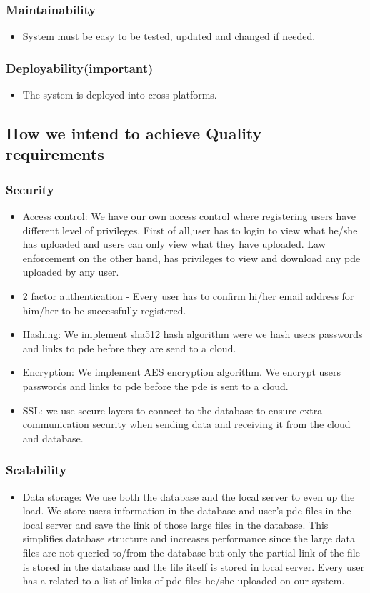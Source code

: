 \documentclass[a4paper,12pt]{article}
\begin{document}
	\subsubsection{Maintainability}
		\begin{itemize}
			\item System must be easy to be tested, updated and changed if needed.
		\end{itemize}
	\subsubsection{Deployability(important)}
		\begin{itemize}
			\item The system is deployed into cross platforms.
		\end{itemize}
\subsection{How we intend to achieve Quality requirements}
\subsubsection{Security}
	\begin{itemize}
		\item Access control: We have our own access control where registering users have different level of privileges. First of all,user has to login to view what he/she has uploaded and users can only view what they have uploaded. Law enforcement on the other hand, has privileges to view and download any pde uploaded by any user.
		\item 2 factor authentication - Every user has to confirm hi/her email address for him/her to be successfully registered.
		\item Hashing: We implement sha512 hash algorithm were we hash users passwords and links to pde before they are send to a cloud. 
		\item Encryption: We implement AES encryption algorithm. We encrypt users passwords and links to pde before the pde is sent to a cloud. 
		\item SSL: we use secure layers to connect to the database to ensure extra communication security when sending data and receiving it from the cloud and database.
	\end{itemize}
\subsubsection{Scalability}
	\begin{itemize}
		\item Data storage: We use both the database and the local server to even up the load. We store users information in the database and user's pde files in the local server and save the link of those large files in the database. This simplifies database structure and increases performance since the large data files are not queried to/from the database but only the partial link of the file is stored in the database and the file itself is stored in local server. Every user has a related to a list of links of pde files he/she uploaded on our system. 
	\end{itemize}
\end{document}
